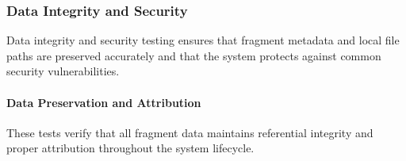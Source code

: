\documentclass[12pt, titlepage]{article}
\begin{document}
\subsubsection{Data Integrity and Security}

Data integrity and security testing ensures that fragment metadata and local file paths are preserved accurately and that the system protects against common security vulnerabilities.

\paragraph{Data Preservation and Attribution}

These tests verify that all fragment data maintains referential integrity and proper attribution throughout the system lifecycle.
\end{document}
